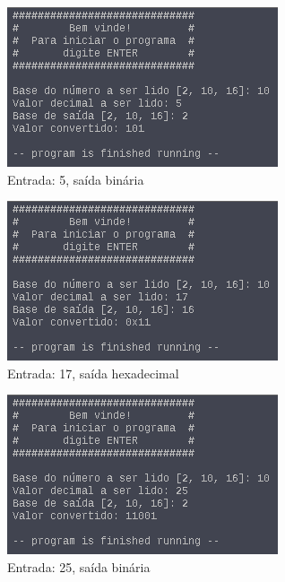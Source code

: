 \documentclass{article}
\begin{document}
\begin{figure}[H]
  \includegraphics[width=\linewidth]{./CasoDec4}
  \caption{Entrada: 5, saída binária}
  \label{fig:dec5}
\end{figure}

\begin{figure}[H]
  \includegraphics[width=\linewidth]{./CasoDec5}
  \caption{Entrada: 17, saída hexadecimal}
  \label{fig:dec5}
\end{figure}

\begin{figure}[H]
  \includegraphics[width=\linewidth]{./CasoDec6}
  \caption{Entrada: 25, saída binária}
  \label{fig:dec6}
\end{figure}
\end{document}
